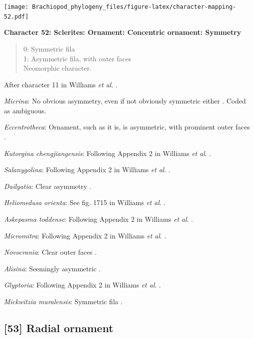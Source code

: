 \documentclass[openany]{book}
\theoremstyle{definition}
\theoremstyle{definition}
\theoremstyle{definition}
\theoremstyle{remark}
\begin{document}
\texttt{[image: Brachiopod\_phylogeny\_files/figure-latex/character-mapping-52.pdf]}

\textbf{Character 52: Sclerites: Ornament: Concentric ornament:
Symmetry}

\begin{quote}
0: Symmetric fila\\
1: Asymmetric fila, with outer faces\\
Neomorphic character.
\end{quote}

After character 11 in Williams \emph{et al}.
\citeyearpar{Williams1998Thediversity}.

\emph{Micrina}: No obvious asymmetry, even if not obviously symmetric
either \citep{Holmer2008TheEarly}. Coded as ambiguous.

\emph{Eccentrotheca}: Ornament, such as it is, is asymmetric, with
prominent outer faces \citep{Skovsted2011Scleritomeconstruction}.

\emph{Kutorgina chengjiangensis}: Following Appendix 2 in Williams
\emph{et al}. \citeyearpar{Williams1998Thediversity}.

\emph{Salanygolina}: Following Appendix 2 in Williams \emph{et al}.
\citeyearpar{Williams1998Thediversity}.

\emph{Dailyatia}: Clear asymmetry \citep{Skovsted2015Theearly}.

\emph{Heliomedusa orienta}: See fig. 1715 in Williams \emph{et al}.
\citeyearpar{Williams2007PartH}.

\emph{Askepasma toddense}: Following Appendix 2 in Williams \emph{et
al}. \citeyearpar{Williams1998Thediversity}.

\emph{Micromitra}: Following Appendix 2 in Williams \emph{et al}.
\citeyearpar{Williams1998Thediversity}.

\emph{Novocrania}: Clear outer faces \citep[fig.
100.2b]{Williams2000BrachiopodaLinguliformea}.

\emph{Alisina}: Seemingly asymmetric \citetext{\citealp[fig.
122.3c]{Williams2000BrachiopodaLinguliformea}; \citealp[Fig.
1]{Zhang2011Anobolellate}}.

\emph{Glyptoria}: Following Appendix 2 in Williams \emph{et al}.
\citeyearpar{Williams1998Thediversity}.

\emph{Mickwitzia muralensis}: Symmetric fila
\citep{Balthasar2004Shellstructure}.

\hypertarget{radial-ornament}{%
\subsection*{{[}53{]} Radial ornament}\label{radial-ornament}}
\end{document}
